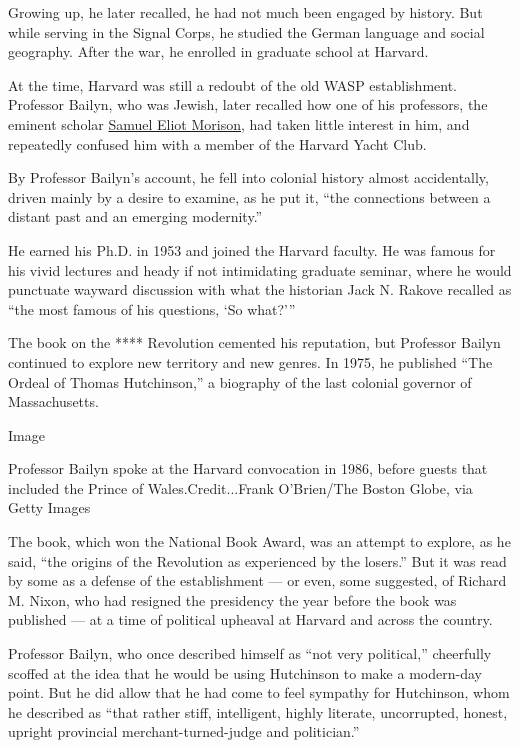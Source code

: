 Growing up, he later recalled, he had not much been engaged by history.
But while serving in the Signal Corps, he studied the German language
and social geography. After the war, he enrolled in graduate school at
Harvard.

At the time, Harvard was still a redoubt of the old WASP establishment.
Professor Bailyn, who was Jewish, later recalled how one of his
professors, the eminent scholar
\href{https://www.nytimes.com/1976/05/16/archives/adm-morison-88-historian-is-dead-samuel-eliot-morison-historian-is.html\#:~:text=Samuel\%20Eliot\%20Morison\%2C\%20the\%20undisputed,in\%20Maine\%20in\%20the\%20summer.}{Samuel
Eliot Morison}, had taken little interest in him, and repeatedly
confused him with a member of the Harvard Yacht Club.

By Professor Bailyn's account, he fell into colonial history almost
accidentally, driven mainly by a desire to examine, as he put it, ``the
connections between a distant past and an emerging modernity.''

He earned his Ph.D. in 1953 and joined the Harvard faculty. He was
famous for his vivid lectures and heady if not intimidating graduate
seminar, where he would punctuate wayward discussion with what the
historian Jack N. Rakove recalled as ``the most famous of his questions,
`So what?'''

The book on the **** Revolution cemented his reputation, but Professor
Bailyn continued to explore new territory and new genres. In 1975, he
published ``The Ordeal of Thomas Hutchinson,'' a biography of the last
colonial governor of Massachusetts.

Image

Professor Bailyn spoke at the Harvard convocation in 1986, before guests
that included the Prince of Wales.Credit...Frank O'Brien/The Boston
Globe, via Getty Images

The book, which won the National Book Award, was an attempt to explore,
as he said, ``the origins of the Revolution as experienced by the
losers.'' But it was read by some as a defense of the establishment ---
or even, some suggested, of Richard M. Nixon, who had resigned the
presidency the year before the book was published --- at a time of
political upheaval at Harvard and across the country.

Professor Bailyn, who once described himself as ``not very political,''
cheerfully scoffed at the idea that he would be using Hutchinson to make
a modern-day point. But he did allow that he had come to feel sympathy
for Hutchinson, whom he described as ``that rather stiff, intelligent,
highly literate, uncorrupted, honest, upright provincial
merchant-turned-judge and politician.''

